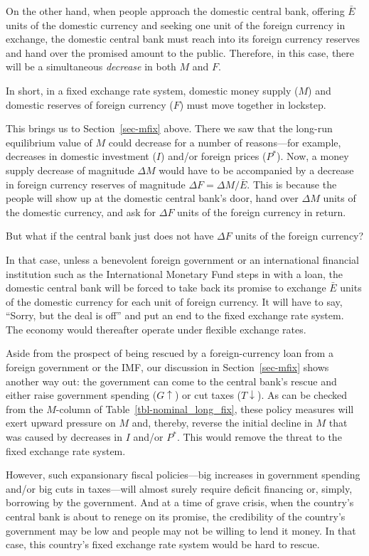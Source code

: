 \documentclass[
  letterpaper,
]{book}
\theoremstyle{plain}
\theoremstyle{remark}
\begin{document}
On the other hand, when people approach the domestic central bank,
offering \(\bar{E}\) units of the domestic currency and seeking one unit
of the foreign currency in exchange, the domestic central bank must
reach into its foreign currency reserves and hand over the promised
amount to the public. Therefore, in this case, there will be a
simultaneous \emph{decrease} in both \(M\) and \(F\).

In short, in a fixed exchange rate system, domestic money supply (\(M\))
and domestic reserves of foreign currency (\(F\)) must move together in
lockstep.

This brings us to Section~\ref{sec-mfix} above. There we saw that the
long-run equilibrium value of \(M\) could decrease for a number of
reasons---for example, decreases in domestic investment (\(I\)) and/or
foreign prices (\(P^*\)). Now, a money supply decrease of magnitude
\(\Delta M\) would have to be accompanied by a decrease in foreign
currency reserves of magnitude \(\Delta F=\Delta M/\bar{E}\). This is
because the people will show up at the domestic central bank's door,
hand over \(\Delta M\) units of the domestic currency, and ask for
\(\Delta F\) units of the foreign currency in return.

But what if the central bank just does not have \(\Delta F\) units of
the foreign currency?

In that case, unless a benevolent foreign government or an international
financial institution such as the International Monetary Fund steps in
with a loan, the domestic central bank will be forced to take back its
promise to exchange \(\bar{E}\) units of the domestic currency for each
unit of foreign currency. It will have to say, ``Sorry, but the deal is
off'' and put an end to the fixed exchange rate system. The economy
would thereafter operate under flexible exchange rates.

Aside from the prospect of being rescued by a foreign-currency loan from
a foreign government or the IMF, our discussion in
Section~\ref{sec-mfix} shows another way out: the government can come to
the central bank's rescue and either raise government spending
(\(G\uparrow\)) or cut taxes (\(T\downarrow\)). As can be checked from
the \(M\)-column of Table~\ref{tbl-nominal_long_fix}, these policy
measures will exert upward pressure on \(M\) and, thereby, reverse the
initial decline in \(M\) that was caused by decreases in \(I\) and/or
\(P^*\). This would remove the threat to the fixed exchange rate system.

However, such expansionary fiscal policies---big increases in government
spending and/or big cuts in taxes---will almost surely require deficit
financing or, simply, borrowing by the government. And at a time of
grave crisis, when the country's central bank is about to renege on its
promise, the credibility of the country's government may be low and
people may not be willing to lend it money. In that case, this country's
fixed exchange rate system would be hard to rescue.
\end{document}
